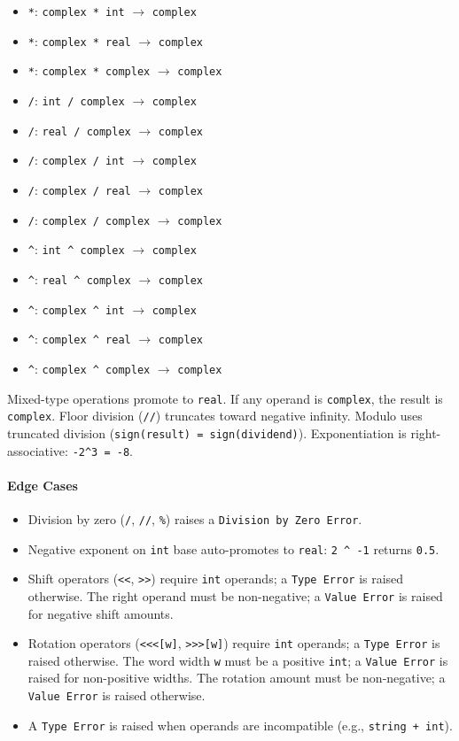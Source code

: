 \begin{itemize}
\item \texttt{*}: \texttt{complex * int} $\rightarrow$ \texttt{complex}
\item \texttt{*}: \texttt{complex * real} $\rightarrow$ \texttt{complex}
\item \texttt{*}: \texttt{complex * complex} $\rightarrow$ \texttt{complex}
\item \texttt{/}: \texttt{int / complex} $\rightarrow$ \texttt{complex}
\item \texttt{/}: \texttt{real / complex} $\rightarrow$ \texttt{complex}
\item \texttt{/}: \texttt{complex / int} $\rightarrow$ \texttt{complex}
\item \texttt{/}: \texttt{complex / real} $\rightarrow$ \texttt{complex}
\item \texttt{/}: \texttt{complex / complex} $\rightarrow$ \texttt{complex}
\item \texttt{\^{}}: \texttt{int \^{} complex} $\rightarrow$ \texttt{complex}
\item \texttt{\^{}}: \texttt{real \^{} complex} $\rightarrow$ \texttt{complex}
\item \texttt{\^{}}: \texttt{complex \^{} int} $\rightarrow$ \texttt{complex}
\item \texttt{\^{}}: \texttt{complex \^{} real} $\rightarrow$ \texttt{complex}
\item \texttt{\^{}}: \texttt{complex \^{} complex} $\rightarrow$ \texttt{complex}
\end{itemize}

Mixed-type operations promote to \texttt{real}. If any operand is \texttt{complex}, the result is \texttt{complex}. Floor division (\texttt{//}) truncates toward negative infinity. Modulo uses truncated division (\texttt{sign(result) = sign(dividend)}). Exponentiation is right-associative: \texttt{-2\^{}3 = -8}.

\paragraph{Edge Cases}
\begin{itemize}
\item Division by zero (\texttt{/}, \texttt{//}, \texttt{\%}) raises a \texttt{Division by Zero Error}.
\item Negative exponent on \texttt{int} base auto-promotes to \texttt{real}: \texttt{2 \^{} -1} returns \texttt{0.5}.
\item Shift operators (\texttt{<<}, \texttt{>>}) require \texttt{int} operands; a \texttt{Type Error} is raised otherwise. The right operand must be non-negative; a \texttt{Value Error} is raised for negative shift amounts.
\item Rotation operators (\texttt{<<<[w]}, \texttt{>>>[w]}) require \texttt{int} operands; a \texttt{Type Error} is raised otherwise. The word width \texttt{w} must be a positive \texttt{int}; a \texttt{Value Error} is raised for non-positive widths. The rotation amount must be non-negative; a \texttt{Value Error} is raised otherwise.
\item A \texttt{Type Error} is raised when operands are incompatible (e.g., \texttt{string + int}).
\end{itemize}

